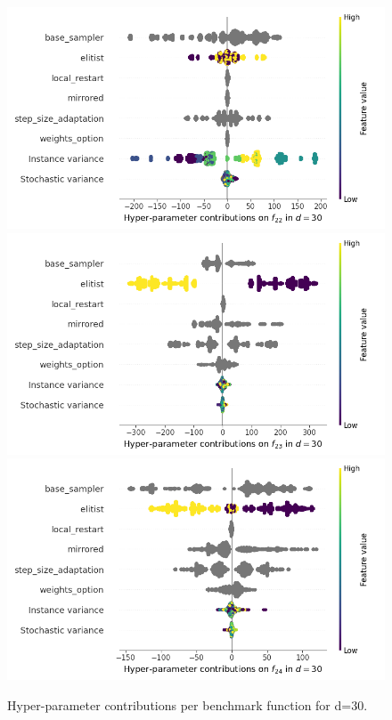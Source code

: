 \begin{figure}[t]
	\includegraphics[height=0.15\textheight,trim=60mm 0mm 30mm 0mm,clip]{images/img_summary_f22_d30.png}
	\includegraphics[height=0.15\textheight,trim=60mm 0mm 30mm 0mm,clip]{images/img_summary_f23_d30.png}
	\includegraphics[height=0.15\textheight,trim=60mm 0mm 0mm 0mm,clip]{images/img_summary_f24_d30.png}
\caption{Hyper-parameter contributions per benchmark function for d=30. \label{fig:shapxplaind30}}

\end{figure}

